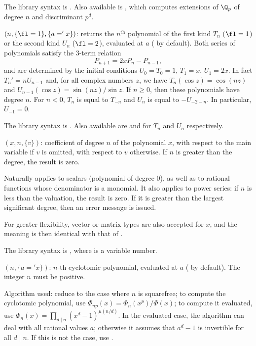 The library syntax is .
Also available is , which computes extensions of $\Q_p$ of degree $n$ and
discriminant $p^d$.

$(n,\{\fl=1\},\{a='x\})$: \label{se:polchebyshev}returns the $n^{\text{th}}$
 polynomial of the first kind $T_n$ ($\fl=1$) or the second
kind $U_n$ ($\fl=2$), evaluated at $a$ ( by default). Both series of
polynomials satisfy the 3-term relation
$$ P_{n+1} = 2xP_n - P_{n-1}, $$
and are determined by the initial conditions $U_0 = T_0 = 1$, $T_1 = x$,
$U_1 = 2x$. In fact $T_n' = n U_{n-1}$ and, for all complex numbers $z$, we
have $T_n(\cos z) = \cos (nz)$ and $U_{n-1}(\cos z) = \sin(nz)/\sin z$.
If $n \geq 0$, then these polynomials have degree $n$.  For $n < 0$,
$T_n$ is equal to $T_{-n}$ and $U_n$ is equal to $-U_{-2-n}$.
In particular, $U_{-1} = 0$.

The library syntax is .
Also available are  and
 for $T_n$ and $U_n$ respectively.

$(x,n,\{v\})$: \label{se:polcoeff}coefficient of degree $n$ of the polynomial $x$, with respect to the
main variable if $v$ is omitted, with respect to $v$ otherwise.  If $n$
is greater than the degree, the result is zero.

Naturally applies to scalars (polynomial of degree $0$), as well as to
rational functions whose denominator is a monomial.
It also applies to power series: if $n$ is less than the valuation, the result
is zero. If it is greater than the largest significant degree, then an error
message is issued.

 For greater flexibility, vector or matrix types are also accepted for $x$,
 and the meaning is then identical with that of .

The library syntax is , where  is a variable number.

$(n,\{a = 'x\})$: \label{se:polcyclo}$n$-th cyclotomic polynomial, evaluated at $a$ ( by default). The
integer $n$ must be positive.

Algorithm used: reduce to the case where $n$ is squarefree; to compute the
cyclotomic polynomial, use $\Phi_{np}(x)=\Phi_n(x^p)/\Phi(x)$; to compute
it evaluated, use $\Phi_n(x) = \prod_{d\mid n} (x^d-1)^{\mu(n/d)}$. In the
evaluated case, the algorithm can deal with all rational values $a$;
otherwise it assumes that $a^d - 1$ is invertible for all $d\mid n$. If this
is not the case, use .

